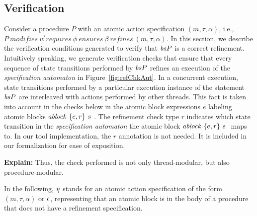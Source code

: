 \subsection{Verification}

Consider a procedure $P$ with an atomic action specification $(m, \tau, \alpha)$, i.e., $P\ \mathit{modifies}\ \overrightarrow{w}\ \mathit{requires}\ \phi\ \mathit{ensures}\ \beta\ \mathit{refines}\ (m, \tau, \alpha)$. In this section, we describe the verification conditions generated to verify that $\mathit{bs}{P}$ is a correct refinement. Intuitively speaking, we generate verification checks that ensure that every sequence of state transitions performed by $\mathit{bs}{P}$ refines an execution of the {\em specification automaton} in Figure~\ref{fig:refChkAut}. In a concurrent execution, state transitions performed by a particular execution instance of the statement $\mathit{bs}{P}$ are interleaved with actions performed by other threads. This fact is taken into account in the checks below in the atomic block expressions $e$ labeling atomic blocks $\mathit{ablock}\ {\{e,r\}}\ {s}\ $. The refinement check type $r$ indicates which state transition in the {\em specification automaton} the atomic block $\mathit{ablock}\ {\{e,r\}}\ {s}\ $ maps to. In our tool implementation, the $r$ annotation is not needed. It is included in our formalization for ease of exposition. 


{\bf Explain:} Thus, the check performed is not only thread-modular, but also procedure-modular. 

In the following, ${\eta}$ stands for an atomic action specification of the form $(m, \tau, \alpha)$ or $\epsilon$, representing that an atomic block is in the body of a procedure that does not have a refinement specification. 

